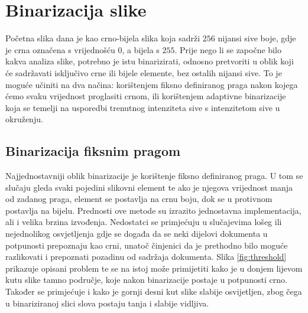 \documentclass[times, utf8, zavrsni, numeric]{fer}
\begin{document}
\chapter{Binarizacija slike}
\label{ch:binarization}
Početna slika dana je kao crno-bijela slika koja sadrži $256$ nijansi sive boje, gdje je crna označena s vrijednošću $0$, a bijela s $255$.
Prije nego li se započne bilo kakva analiza slike, potrebno je istu binarizirati, odnosno pretvoriti u oblik koji će sadržavati isključivo crne ili bijele elemente, bez ostalih nijansi sive.
To je moguće učiniti na dva načina: korištenjem fiksno definiranog praga nakon kojega ćemo svaku vrijednost proglasiti crnom, ili korištenjem adaptivne binarizacije koja se temelji na usporedbi trenutnog intenziteta sive s intenzitetom sive u okruženju.

\section{Binarizacija fiksnim pragom}
Najjednostavniji oblik binarizacije je korištenje fiksno definiranog praga.
U tom se slučaju gleda svaki pojedini slikovni element te ako je njegova vrijednost manja od zadanog praga, element se postavlja na crnu boju, dok se u protivnom postavlja na bijelu.
Prednosti ove metode su izrazito jednostavna implementacija, ali i velika brzina izvođenja. 
Nedostatci se primjećuju u slučajevima lošeg ili nejednolikog osvjetljenja gdje se događa da se neki dijelovi dokumenta u potpunosti prepoznaju kao crni, unatoč činjenici da je prethodno bilo moguće razlikovati i prepoznati pozadinu od sadržaja dokumenta.
Slika \ref{fig:threshold} prikazuje opisani problem te se na istoj može primijetiti kako je u donjem lijevom kutu slike tamno područje, koje nakon binarizacije postaje u potpunosti crno. 
Također se primjećuje i kako je gornji desni kut slike slabije osvijetljen, zbog čega u binariziranoj slici slova postaju tanja i slabije vidljiva.\\
\end{document}
